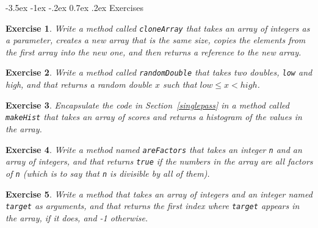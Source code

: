\documentclass[12pt]{book}
\makeatletter
\theoremstyle{exercise}
\newtheorem{exercise}{Exercise}[chapter]
\newcommand{\java}[1]{\verb"#1"}
\renewcommand{\section}{\@startsection {section}{1}{\z@}%
    {-3.5ex \@plus -1ex \@minus -.2ex}%
    {0.7ex \@plus.2ex}%
    {\normalfont\Large\bfseries}}
\newcommand{\java}[1]{\lstinline{#1}} %
\makeatother
\begin{document}
\section{Exercises}


\begin{exercise}
Write a method called \java{cloneArray} that takes an array of integers as a parameter, creates a new array that is the same size, copies the elements from the first array into the new one, and then returns a reference to the new array.
\end{exercise}


\begin{exercise}
Write a method called \java{randomDouble} that takes two doubles, \java{low} and {high}, and that returns a random double $x$ such that $low \le x < high$.
\end{exercise}


\begin{exercise}
Encapsulate the code in Section~\ref{singlepass} in a method called \java{makeHist} that takes an array of scores and returns a histogram of the values in the array.
\end{exercise}


\begin{exercise}
Write a method named \java{areFactors} that takes an integer \java{n} and an array of integers, and that returns \java{true} if the numbers in the array are all factors of \java{n} (which is to say that \java{n} is divisible by all of them).
\end{exercise}


\begin{exercise}
Write a method that takes an array of integers and an integer named \java{target} as arguments, and that returns the first index where \java{target} appears in the array, if it does, and -1 otherwise.
\end{exercise}
\end{document}
